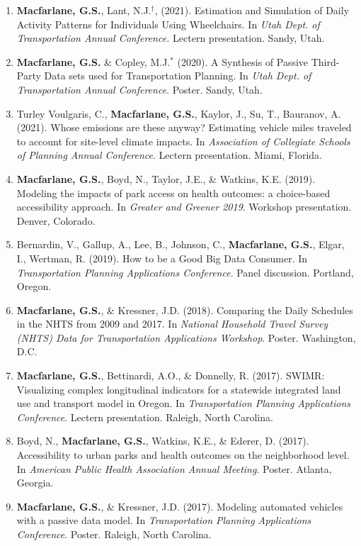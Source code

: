 \documentclass[margin,line]{res}
\newcounter{enuminitialize}
\newenvironment{myenum}[1][]
{%
 \setcounter{enuminitialize}{#1}
 \addtocounter{enuminitialize}{2}
 \begin{enumerate}[left= 4pt, itemsep=8pt, start=\value{enuminitialize}, label=\arabic*\addtocounter{enumi}{-2}]
}
{%
 \end{enumerate}
}
\begin{document}
\begin{resume}
\begin{myenum}[33]
\item \textbf{Macfarlane, G.S.}, Lant, N.J.$^\dagger$, (2021). Estimation and Simulation of Daily Activity Patterns for Individuals Using Wheelchairs. In \textit{Utah Dept. of Transportation Annual Conference.} Lectern presentation. Sandy, Utah.
\item \textbf{Macfarlane, G.S.} \& Copley, M.J.$^*$ (2020).  A Synthesis of Passive Third-Party Data sets used for Transportation Planning. In \textit{Utah Dept. of Transportation Annual Conference}. Poster. Sandy, Utah.
\item Turley Voulgaris, C., \textbf{Macfarlane, G.S.}, Kaylor, J., Su, T., Bauranov, A. (2021). Whose emissions are these anyway? Estimating vehicle miles traveled to account for site-level climate impacts. In \textit{Association of Collegiate Schools of Planning Annual Conference}. Lectern presentation. Miami, Florida.
\item \textbf{Macfarlane, G.S.}, Boyd, N., Taylor, J.E., \& Watkins, K.E. (2019). Modeling the impacts of park access on health outcomes: a choice-based accessibility approach. In \textit{ Greater and Greener 2019}. Workshop presentation. Denver, Colorado.
\item Bernardin, V., Gallup, A., Lee, B., Johnson, C., \textbf{Macfarlane, G.S.}, Elgar, I., Wertman, R. (2019). How to be a Good Big Data Consumer. In \textit{ Transportation Planning Applications Conference}. Panel discussion. Portland, Oregon.
\item \textbf{Macfarlane, G.S.}, \& Kressner, J.D. (2018). Comparing the Daily Schedules in the NHTS from 2009 and 2017. In \textit{ National Household Travel Survey (NHTS) Data for Transportation Applications Workshop}. Poster. Washington, D.C.
\item \textbf{Macfarlane, G.S.}, Bettinardi, A.O., \& Donnelly, R. (2017). SWIMR: Visualizing complex longitudinal indicators for a statewide integrated land use and transport model in Oregon. In \textit{Transportation Planning Applications Conference}. Lectern presentation. Raleigh, North Carolina.
\item Boyd, N., \textbf{Macfarlane, G.S.}, Watkins, K.E., \& Ederer, D. (2017). Accessibility to urban parks and health outcomes on the neighborhood level. In \textit{ American Public Health Association Annual Meeting}. Poster. Atlanta, Georgia.
\item \textbf{Macfarlane, G.S.}, \& Kressner, J.D. (2017). Modeling automated vehicles with a passive data model. In \textit{ Transportation Planning Applications Conference}. Poster. Raleigh, North Carolina.

\end{myenum}
\end{resume}
\end{document}
